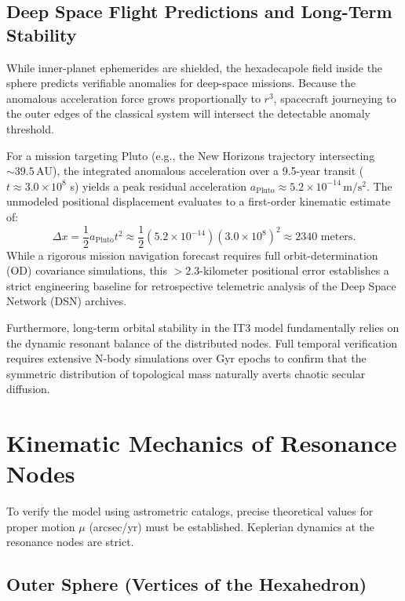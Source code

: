 \documentclass[11pt,a4paper]{article}
\theoremstyle{remark}
\newcommand{\AU}{\,\mathrm{AU}}
\begin{document}
\subsection{Deep Space Flight Predictions and Long-Term Stability}

While inner-planet ephemerides are shielded, the hexadecapole field inside the sphere predicts verifiable anomalies for deep-space missions. Because the anomalous acceleration force grows proportionally to $r^3$, spacecraft journeying to the outer edges of the classical system will intersect the detectable anomaly threshold. 

For a mission targeting Pluto (e.g., the New Horizons trajectory intersecting $\sim 39.5\AU$), the integrated anomalous acceleration over a 9.5-year transit ($t \approx 3.0 \times 10^8$ s) yields a peak residual acceleration $a_{\text{Pluto}} \approx 5.2 \times 10^{-14}\,\mathrm{m/s^2}$. The unmodeled positional displacement evaluates to a first-order kinematic estimate of:
\begin{equation}
    \Delta x = \frac{1}{2} a_{\text{Pluto}} t^2 \approx \frac{1}{2} (5.2 \times 10^{-14}) (3.0 \times 10^8)^2 \approx 2340 \text{ meters}.
\end{equation}
While a rigorous mission navigation forecast requires full orbit-determination (OD) covariance simulations, this $>2.3$-kilometer positional error establishes a strict engineering baseline for retrospective telemetric analysis of the Deep Space Network (DSN) archives.

Furthermore, long-term orbital stability in the IT3 model fundamentally relies on the dynamic resonant balance of the distributed nodes. Full temporal verification requires extensive N-body simulations over Gyr epochs to confirm that the symmetric distribution of topological mass naturally averts chaotic secular diffusion.

\section{Kinematic Mechanics of Resonance Nodes}

To verify the model using astrometric catalogs, precise theoretical values for proper motion $\mu$ (arcsec/yr) must be established. Keplerian dynamics at the resonance nodes are strict.

\subsection{Outer Sphere (Vertices of the Hexahedron)}
\end{document}
